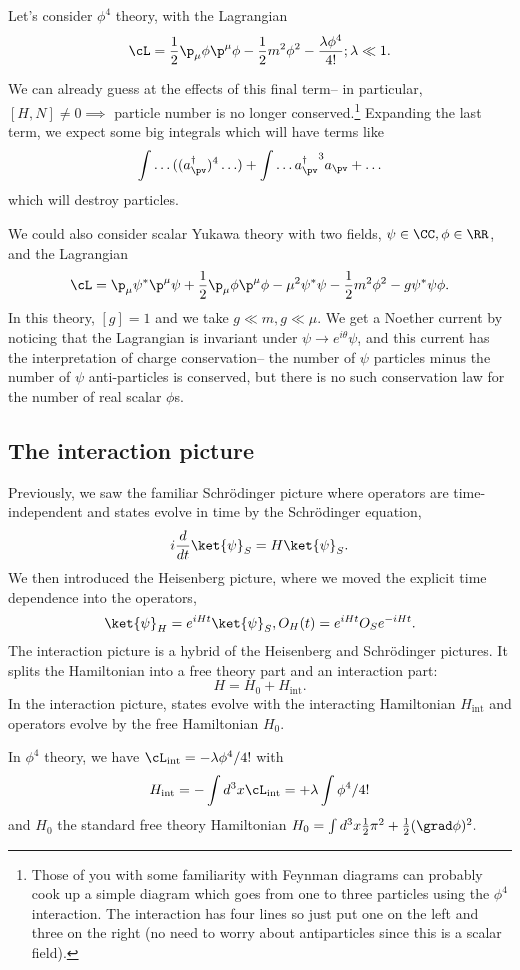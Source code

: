 \begin{exm}
Let's consider $\phi^4$ theory, with the Lagrangian
$$\cL = \frac{1}{2}\p_\mu \phi \p^\mu \phi -\frac{1}{2}m^2\phi^2-\frac{\lambda\phi^4}{4!}; \lambda \ll 1.$$

We can already guess at the effects of this final term-- in particular,
$[H,N]\neq 0\implies$ particle number is no longer conserved.\footnote{Those of you with some familiarity with Feynman diagrams can probably cook up a simple diagram which goes from one to three particles using the $\phi^4$ interaction. The interaction has four lines so just put one on the left and three on the right (no need to worry about antiparticles since this is a scalar field).} Expanding the last term, we expect some big integrals which will have terms like
$$\int \ldots ((a_{\pv}^\dagger)^4 \ldots) +\int \ldots {a_{\pv}^\dagger}^3 a_{\pv}+\ldots$$
which will destroy particles.
\end{exm}

\begin{exm}
We could also consider scalar Yukawa theory with two fields, $\psi\in \CC,\phi \in \RR$, and the Lagrangian
$$\cL=\p_\mu \psi^* \p^\mu \psi +\frac{1}{2}\p_\mu \phi \p^\mu \phi - \mu^2 \psi^*\psi -\frac{1}{2}m^2 \phi^2 - g\psi^* \psi \phi.$$
In this theory, $[g]=1$ and we take $g\ll m, g\ll \mu$. We get a Noether current by noticing that the Lagrangian is invariant under $\psi\to e^{i\theta}\psi$, and this current has the interpretation of charge conservation-- the number of $\psi$ particles minus the number of $\psi$ anti-particles is conserved, but there is no such conservation law for the number of real scalar $\phi$s.
\end{exm}

\subsection*{The interaction picture} Previously, we saw the familiar Schr\"odinger picture where operators are time-independent and states evolve in time by the Schr\"odinger equation,
$$i \frac{d}{dt}\ket{\psi}_S=H\ket{\psi}_S.$$
We then introduced the Heisenberg picture, where we moved the explicit time dependence into the operators,
$$\ket{\psi}_H = e^{iHt}\ket{\psi}_S, O_H(t)=e^{iHt} O_S e^{-iHt}.$$
The interaction picture is a hybrid of the Heisenberg and Schr\"odinger pictures. It splits the Hamiltonian into a free theory part and an interaction part:
$$H=H_0+H_{\text{int}}.$$
In the interaction picture, states evolve with the interacting Hamiltonian $H_{\mathrm{int}}$ and operators evolve by the free Hamiltonian $H_0$.
\begin{exm}
In $\phi^4$ theory, we have $\cL_{\mathrm{int}}=-\lambda \phi^4/4!$ with $$H_{\mathrm{int}}=-\int d^3x \cL_{\mathrm{int}}=+\lambda \int \phi^4/4!$$
and $H_0$ the standard free theory Hamiltonian
$H_0=\int d^3x \frac{1}{2}\pi^2+\frac{1}{2}(\grad \phi)^2.$
\end{exm}

